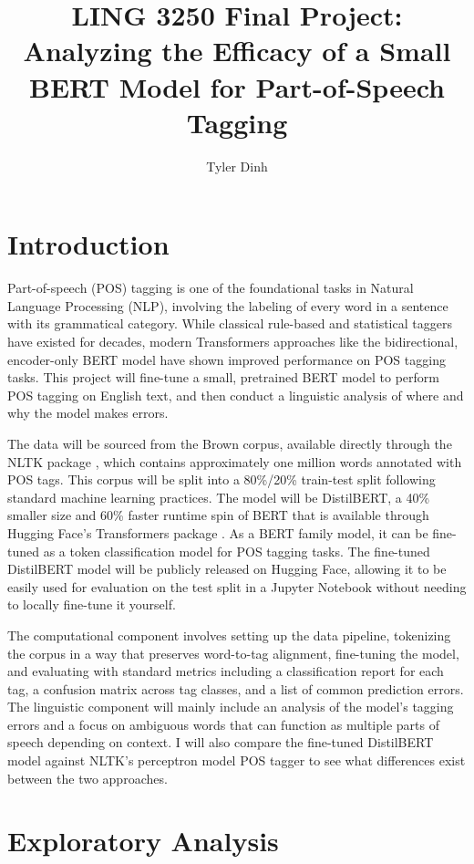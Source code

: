 \documentclass[10pt,twocolumn,letterpaper]{article}
\title{
		\usefont{OT1}{bch}{b}{n}
		\huge LING 3250 Final Project: Analyzing the Efficacy of a Small BERT Model for Part-of-Speech Tagging \\
}
\author[1]{Tyler Dinh}
\affil[1]{Washington University in St. Louis}
\begin{document}
\maketitle

\section{Introduction}

Part-of-speech (POS) tagging is one of the foundational tasks in Natural Language Processing (NLP), involving the labeling of every word in a sentence with its grammatical category. While classical rule-based and statistical taggers have existed for decades, modern Transformers approaches like the bidirectional, encoder-only BERT model have shown improved performance on POS tagging tasks. This project will fine-tune a small, pretrained BERT model to perform POS tagging on English text, and then conduct a linguistic analysis of where and why the model makes errors.

The data will be sourced from the Brown corpus, available directly through the NLTK package \cite{nltk_corpus}, which contains approximately one million words annotated with POS tags. This corpus will be split into a 80\%/20\% train-test split following standard machine learning practices. The model will be DistilBERT, a 40\% smaller size and 60\% faster runtime spin of BERT that is available through Hugging Face’s Transformers package \cite{huggingface_transformers}. As a BERT family model, it can be fine-tuned as a token classification model for POS tagging tasks. The fine-tuned DistilBERT model will be publicly released on Hugging Face, allowing it to be easily used for evaluation on the test split in a Jupyter Notebook without needing to locally fine-tune it yourself.

The computational component involves setting up the data pipeline, tokenizing the corpus in a way that preserves word-to-tag alignment, fine-tuning the model, and evaluating with standard metrics including a classification report for each tag, a confusion matrix across tag classes, and a list of common prediction errors. The linguistic component will mainly include an analysis of the model's tagging errors and a focus on ambiguous words that can function as multiple parts of speech depending on context. I will also compare the fine-tuned DistilBERT model against NLTK's perceptron model POS tagger to see what differences exist between the two approaches.

\section{Exploratory Analysis}
\end{document}
